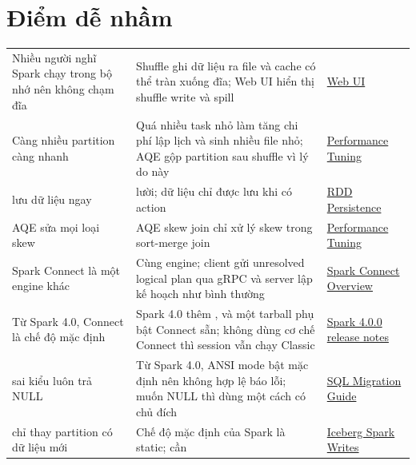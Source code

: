 \section{Điểm dễ nhầm}
\begin{xltabular}{\textwidth}{@{}P{4.2cm} L P{3.4cm}@{}}
\toprule
{} &  &  \\
\midrule
\endhead
\bottomrule
\endfoot
Nhiều người nghĩ Spark chạy trong bộ nhớ nên không chạm đĩa & Shuffle ghi dữ liệu ra file và cache có thể tràn xuống đĩa; Web UI hiển thị shuffle write và spill & \href{https://spark.apache.org/docs/latest/web-ui.html}{Web UI} \\
Càng nhiều partition càng nhanh & Quá nhiều task nhỏ làm tăng chi phí lập lịch và sinh nhiều file nhỏ; AQE gộp partition sau shuffle vì lý do này & \href{https://spark.apache.org/docs/latest/sql-performance-tuning.html}{Performance Tuning} \\
 lưu dữ liệu ngay &  lười; dữ liệu chỉ được lưu khi có action & \href{https://spark.apache.org/docs/latest/rdd-programming-guide.html\#rdd-persistence}{RDD Persistence} \\
AQE sửa mọi loại skew & AQE skew join chỉ xử lý skew trong sort-merge join & \href{https://spark.apache.org/docs/latest/sql-performance-tuning.html}{Performance Tuning} \\
Spark Connect là một engine khác & Cùng engine; client gửi unresolved logical plan qua gRPC và server lập kế hoạch như bình thường & \href{https://spark.apache.org/docs/latest/spark-connect-overview.html}{Spark Connect Overview} \\
Từ Spark 4.0, Connect là chế độ mặc định & Spark 4.0 thêm ,  và một tarball phụ bật Connect sẵn; không dùng cơ chế Connect thì session vẫn chạy Classic & \href{https://spark.apache.org/releases/spark-release-4-0-0.html}{Spark 4.0.0 release notes} \\
 sai kiểu luôn trả NULL & Từ Spark 4.0, ANSI mode bật mặc định nên  không hợp lệ báo lỗi; muốn NULL thì dùng  một cách có chủ đích & \href{https://spark.apache.org/docs/latest/sql-migration-guide.html}{SQL Migration Guide} \\
 chỉ thay partition có dữ liệu mới & Chế độ mặc định của Spark là static; cần  & \href{https://iceberg.apache.org/docs/latest/spark-writes/}{Iceberg Spark Writes} \\
\end{xltabular}
